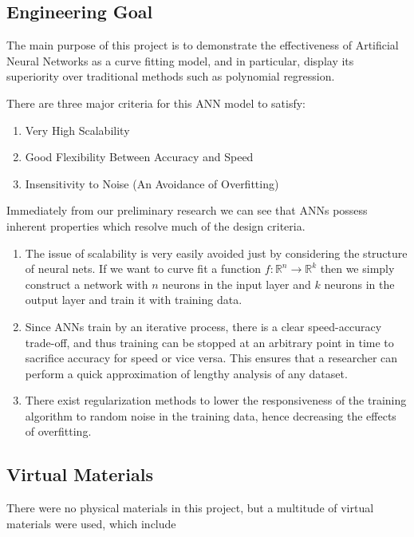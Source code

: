 \documentclass{article}
\begin{document}
\subsection{Engineering Goal}
The main purpose of this project is to demonstrate the effectiveness of Artificial Neural Networks as a curve fitting model, and in particular, display its superiority over traditional methods such as polynomial regression.

There are three major criteria for this ANN model to satisfy:

\begin{enumerate}
    \item Very High Scalability
    \item Good Flexibility Between Accuracy and Speed
    \item Insensitivity to Noise (An Avoidance of Overfitting)
\end{enumerate}

Immediately from our preliminary research we can see that ANNs possess inherent properties which resolve much of the design criteria.

\begin{enumerate}
    \item The issue of scalability is very easily avoided just by considering the structure of neural nets. If we want to curve fit a function $f: \mathbb{R}^n \rightarrow \mathbb{R}^k$ then we simply construct a network with $n$ neurons in the input layer and $k$ neurons in the output layer and train it with training data.
    \item Since ANNs train by an iterative process, there is a clear speed-accuracy trade-off, and thus training can be stopped at an arbitrary point in time to sacrifice accuracy for speed or vice versa. This ensures that a researcher can perform a quick approximation of lengthy analysis of any dataset.
    \item There exist regularization methods to lower the responsiveness of the training algorithm to random noise in the training data, hence decreasing the effects of overfitting.
\end{enumerate}

\subsection{Virtual Materials}

There were no physical materials in this project, but a multitude of virtual materials were used, which include
\end{document}
